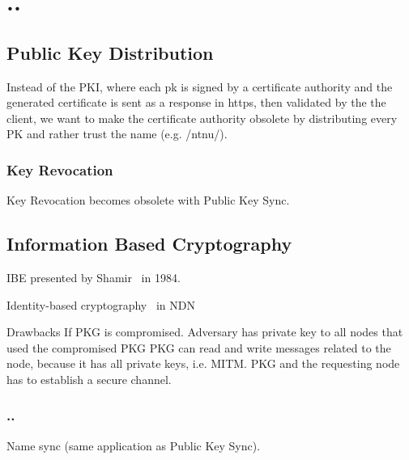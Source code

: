 \chapter{..}

\section{Public Key Distribution}
Instead of the PKI, where each pk is signed by a certificate authority and the generated certificate is sent as a response in https, then validated by the the client, we want to make the certificate authority obsolete by distributing every PK and rather trust the name (e.g. /ntnu/). 

\subsection{Key Revocation}
Key Revocation becomes obsolete with Public Key Sync. 

\section{Information Based Cryptography}
\gls{IBE} presented by Shamir~\cite{DBLP:conf/crypto/Shamir84} in 1984.


Identity-based cryptography~\cite{DBLP:conf/icnp/ZhangCXWSW11} in \gls{NDN}

Drawbacks
If \gls{PKG} is compromised. Adversary has private key to all nodes that used the compromised \gls{PKG}
\gls{PKG} can read and write messages related to the node, because it has all private keys, i.e. \gls{MITM}.
\gls{PKG} and the requesting node has to establish a secure channel. 

\subsection{..}
Name sync (same application as Public Key Sync).
